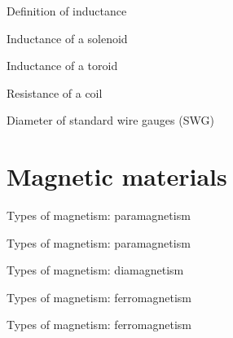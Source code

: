 \documentclass[compress]{beamer}
\begin{document}
{
    \begin{frame}{Definition of inductance}
    \end{frame}
}

{
    \begin{frame}{Inductance of a solenoid}
    \end{frame}
}

{
    \begin{frame}{Inductance of a toroid}
    \end{frame}
}

{
    \begin{frame}{Resistance of a coil}
    \end{frame}
}

{
    \begin{frame}{Diameter of standard wire gauges (SWG)}
    \end{frame}
}

\section{Magnetic materials}

{
    \begin{frame}{Types of magnetism: paramagnetism}
    \end{frame}
}

{
    \begin{frame}{Types of magnetism: paramagnetism}
    \end{frame}
}

{
    \begin{frame}{Types of magnetism: diamagnetism}
    \end{frame}
}

{
    \begin{frame}{Types of magnetism: ferromagnetism}
    \end{frame}
}

{
    \begin{frame}{Types of magnetism: ferromagnetism}
    \end{frame}
}
\end{document}
